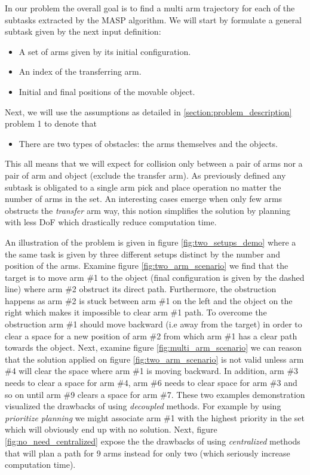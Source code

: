 \documentclass[english]{article}
\theoremstyle{definition}
\begin{document}
In our problem the overall goal is to find a multi arm trajectory for each of the subtasks extracted by the MASP algorithm. We will start by formulate a general subtask given by the next input definition:
\begin{itemize}
	\item A set of arms given by its initial configuration.
	\item An index of the transferring arm.
	\item Initial and final positions of the movable object.
\end{itemize}
Next, we will use the assumptions as detailed in \ref{section:problem_description} problem 1 to denote that 
\begin{itemize}
\item There are two types of obstacles: the arms themselves and the objects.
\end{itemize}
This all means that we will expect for collision only between a pair of arms nor a pair of arm and object (exclude the transfer arm). As previously defined any subtask is obligated to a single arm pick and place operation no matter the number of arms in the set. An interesting cases emerge when only few arms obstructs the \textit{transfer} arm way, this notion simplifies the solution by planning with less DoF which drastically reduce computation time. 

An illustration of the problem is given in figure \ref{fig:two_setups_demo} where a the same task is given by three different setups distinct by the number and position of the arms. Examine figure \ref{fig:two_arm_scenario} we find that the target is to move arm \#1 to the object (final configuration is given by the dashed line) where arm \#2 obstruct its direct path. Furthermore, the obstruction happens as arm \#2 is stuck between arm \#1 on the left and the object on the right which makes it impossible to clear arm \#1 path. To overcome the obstruction arm \#1 should move backward (i.e away from the target) in order to clear a space for a new position of arm \#2 from which arm \#1 has a clear path towards the object. Next, examine figure \ref{fig:multi_arm_scenario} we can reason that  the solution applied on figure \ref{fig:two_arm_scenario} is not valid unless arm \#4 will clear the space where arm \#1 is moving backward. In addition, arm \#3 needs to clear a space for arm \#4, arm \#6 needs to clear space for arm \#3 and so on until arm \#9 clears a space for arm \#7. These two examples demonstration visualized the drawbacks of using \textit{decoupled} methods. For example by using \textit{prioritize planning} we might associate arm \#1 with the highest priority in the set which will obviously end up with no solution. Next, figure \ref{fig:no_need_centralized} expose the the drawbacks of using \textit{centralized} methods that will plan a path for 9 arms instead for only two (which seriously increase computation time).
\end{document}
